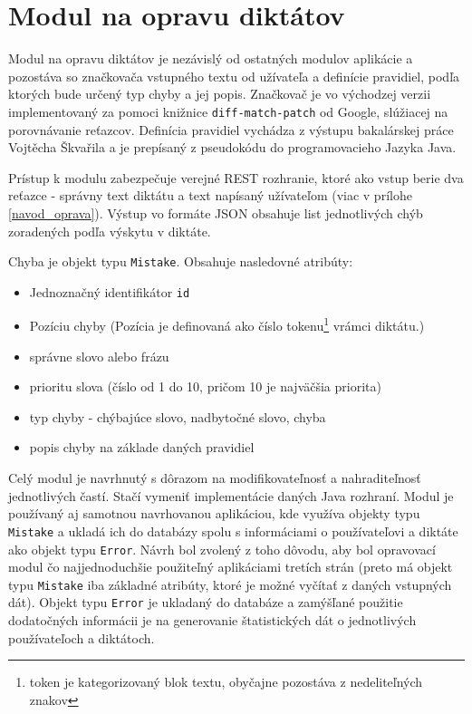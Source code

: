 \documentclass[12pt,oneside]{fithesis2}
\begin{document}
      \section{Modul na opravu diktátov} \label{modul-diktaty}
      
      \par Modul na opravu diktátov je nezávislý od ostatných modulov aplikácie a pozostáva so značkovača vstupného textu od užívateľa a definície pravidiel, podľa ktorých bude určený typ chyby a jej popis. Značkovač je vo východzej verzii implementovaný za pomoci knižnice \texttt{diff-match-patch} od Google\cite{diffmatchpatch}, slúžiacej na porovnávanie reťazcov. Definícia pravidiel vychádza z výstupu bakalárskej práce Vojtěcha Škvařila \cite{skvaril14} a je prepísaný z pseudokódu do programovacieho Jazyka Java.
      \par Prístup k modulu zabezpečuje verejné REST rozhranie, ktoré ako vstup berie dva reťazce - správny text diktátu a text napísaný užívateľom (viac v prílohe \ref{navod_oprava}). Výstup vo formáte JSON obsahuje list jednotlivých chýb zoradených podľa výskytu v diktáte.
      
	  \par Chyba je objekt typu \texttt{Mistake}. Obsahuje nasledovné atribúty: 
\begin{itemize}
	\item Jednoznačný identifikátor \texttt{id}
	\item Pozíciu chyby (Pozícia je definovaná ako číslo tokenu\footnote{token je kategorizovaný blok textu, obyčajne pozostáva z nedeliteľných znakov} vrámci diktátu.)
	\item správne slovo alebo frázu
	\item prioritu slova (číslo od 1 do 10, pričom 10 je najväčšia priorita)
	\item typ chyby - chýbajúce slovo, nadbytočné slovo, chyba
	\item popis chyby na základe daných pravidiel
\end{itemize}
	
      \par Celý modul je navrhnutý s dôrazom na modifikovateľnosť a nahraditeľnosť jednotlivých častí. Stačí vymeniť implementácie daných Java rozhraní. Modul je používaný aj samotnou navrhovanou aplikáciou, kde využíva objekty typu \texttt{Mistake} a ukladá ich do databázy spolu s informáciami o používateľovi a diktáte ako objekt typu \texttt{Error}. Návrh bol zvolený z toho dôvodu, aby bol opravovací modul čo najjednoduchšie použiteľný aplikáciami tretích strán (preto má objekt typu \texttt{Mistake} iba základné atribúty, ktoré je možné vyčítať z daných vstupných dát). Objekt typu \texttt{Error} je ukladaný do databáze a zamýšľané použitie dodatočných informácii je na generovanie štatistických dát o jednotlivých používateľoch a diktátoch.
\end{document}
